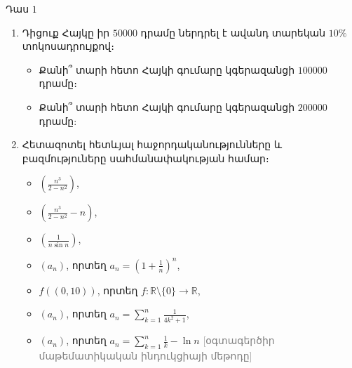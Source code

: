 \documentclass{article}
\begin{document}

Դաս $1$\\
\vspace{2cm}


\begin{enumerate}
    \item Դիցուք Հայկը իր $50000$ դրամը ներդրել է ավանդ տարեկան $10\%$ տոկոսադրույքով։
    \begin{itemize}
        \item Քանի՞ տարի հետո Հայկի գումարը կգերազանցի $100000$ դրամը։\\
        \item Քանի՞ տարի հետո Հայկի գումարը կգերազանցի $200000$ դրամը:
    \end{itemize}
    \item Հետազոտել հետևյալ հաջորդականությունները և բազմություները սահմանափակության համար։
    \begin{itemize}
        \item $\left(\frac{n^3}{2-n^2}\right)$,\\
        \item $\left(\frac{n^3}{2-n^2} - n\right)$,\\
        \item $\left(\frac{1}{n \sin{n}}\right)$,\\
        \item $(a_n)$, որտեղ $a_n = \left(1+\frac{1}{n}\right)^n$,\\
        \item $f((0, 10))$, որտեղ $f: \mathbb{R} \setminus \{0\} \rightarrow \mathbb{R}$,\\
        \item $(a_n)$, որտեղ $a_n = \sum_{k=1}^n\frac{1}{4k^2 + 1}$,\\
        \item $(a_n)$, որտեղ $a_n = \sum_{k=1}^n\frac{1}{k} - \ln{n}$ \textcolor{gray}{[օգտագերծիր մաթեմատիկական ինդուկցիայի մեթոդը]}\\

\end{itemize}
\end{enumerate}
\end{document}
